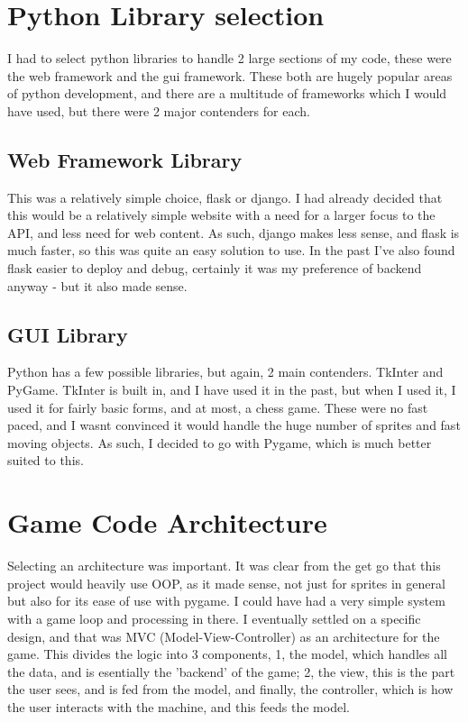 \section{Python Library selection}
I had to select python libraries to handle 2 large sections of my code, these were the web framework and the gui framework. These both are hugely popular areas of python development, and there are a multitude of frameworks which I would have used, but there were 2 major contenders for each.

\subsection{Web Framework Library}
This was a relatively simple choice, flask or django. I had already decided that this would be a relatively simple website with a need for a larger focus to the API, and less need for web content. As such, django makes less sense, and flask is much faster, so this was quite an easy solution to use. In the past I've also found flask easier to deploy and debug, certainly it was my preference of backend anyway - but it also made sense.

\subsection{GUI Library}
Python has a few possible libraries, but again, 2 main contenders. TkInter and PyGame. TkInter is built in, and I have used it in the past, but when I used it, I used it for fairly basic forms, and at most, a chess game. These were no fast paced, and I wasnt convinced it would handle the huge number of sprites and fast moving objects. As such, I decided to go with Pygame, which is much better suited to this.

\section{Game Code Architecture}
Selecting an architecture was important. It was clear from the get go that this project would heavily use OOP, as it made sense, not just for sprites in general but also for its ease of use with pygame. I could have had a very simple system with a game loop and processing in there. I eventually settled on a specific design, and that was MVC (Model-View-Controller) as an architecture for the game.  This divides the logic into 3 components, 1, the model, which handles all the data, and is esentially the 'backend' of the game; 2, the view, this is the part the user sees, and is fed from the model, and finally, the controller, which is how the user interacts with the machine, and this feeds the model. 

